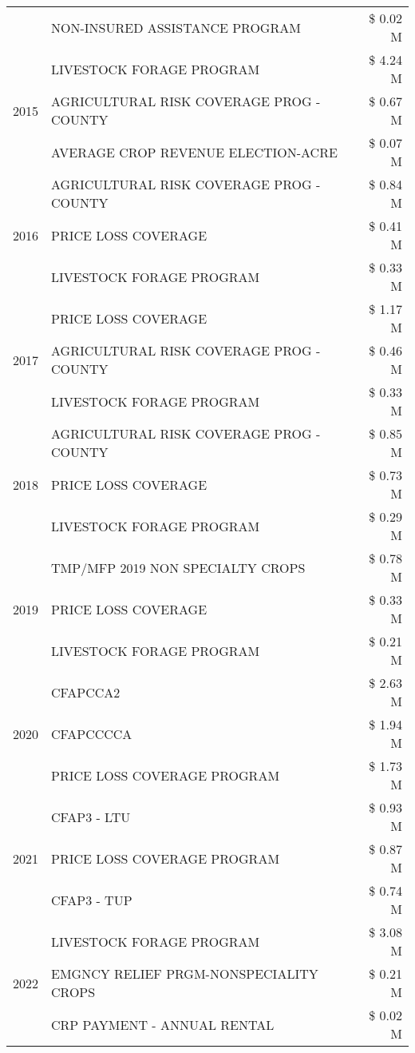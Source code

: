 \begin{tabular}{llr}
 & NON-INSURED ASSISTANCE PROGRAM & \$ 0.02 M \\
\cline{1-3}
\multirow[t]{3}{*}{2015} & LIVESTOCK FORAGE PROGRAM & \$ 4.24 M \\
 & AGRICULTURAL RISK COVERAGE PROG - COUNTY & \$ 0.67 M \\
 & AVERAGE CROP REVENUE ELECTION-ACRE & \$ 0.07 M \\
\cline{1-3}
\multirow[t]{3}{*}{2016} & AGRICULTURAL RISK COVERAGE PROG - COUNTY & \$ 0.84 M \\
 & PRICE LOSS COVERAGE & \$ 0.41 M \\
 & LIVESTOCK FORAGE PROGRAM & \$ 0.33 M \\
\cline{1-3}
\multirow[t]{3}{*}{2017} & PRICE LOSS COVERAGE & \$ 1.17 M \\
 & AGRICULTURAL RISK COVERAGE PROG - COUNTY & \$ 0.46 M \\
 & LIVESTOCK FORAGE PROGRAM & \$ 0.33 M \\
\cline{1-3}
\multirow[t]{3}{*}{2018} & AGRICULTURAL RISK COVERAGE PROG - COUNTY & \$ 0.85 M \\
 & PRICE LOSS COVERAGE & \$ 0.73 M \\
 & LIVESTOCK FORAGE PROGRAM & \$ 0.29 M \\
\cline{1-3}
\multirow[t]{3}{*}{2019} & TMP/MFP 2019 NON SPECIALTY CROPS & \$ 0.78 M \\
 & PRICE LOSS COVERAGE & \$ 0.33 M \\
 & LIVESTOCK FORAGE PROGRAM & \$ 0.21 M \\
\cline{1-3}
\multirow[t]{3}{*}{2020} & CFAPCCA2 & \$ 2.63 M \\
 & CFAPCCCCA & \$ 1.94 M \\
 & PRICE LOSS COVERAGE PROGRAM & \$ 1.73 M \\
\cline{1-3}
\multirow[t]{3}{*}{2021} & CFAP3 - LTU & \$ 0.93 M \\
 & PRICE LOSS COVERAGE PROGRAM & \$ 0.87 M \\
 & CFAP3 - TUP & \$ 0.74 M \\
\cline{1-3}
\multirow[t]{3}{*}{2022} & LIVESTOCK FORAGE PROGRAM & \$ 3.08 M \\
 & EMGNCY RELIEF PRGM-NONSPECIALITY CROPS & \$ 0.21 M \\
 & CRP PAYMENT - ANNUAL RENTAL & \$ 0.02 M \\
\cline{1-3}
\bottomrule
\end{tabular}
